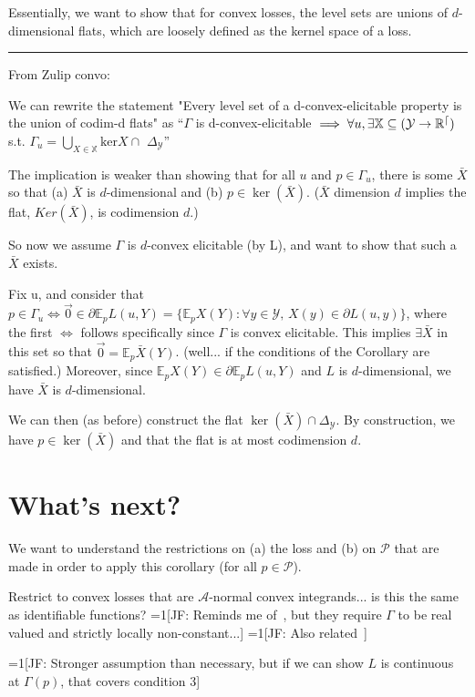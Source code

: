 \documentclass[12pt]{article}
\newcommand{\Comments}{1}
\newcommand{\mynote}[2]{\ifnum\Comments=1\textcolor{#1}{#2}\fi}
\newcommand{\jessie}[1]{\mynote{green!75!black}{[JF: #1]}}
\newcommand{\A}{\mathcal{A}}
\newcommand{\E}{\mathbb{E}}
\renewcommand{\P}{\mathcal{P}}
\begin{document}
Essentially, we want to show that for convex losses, the level sets are unions of $d$-dimensional flats, which are loosely defined as the kernel space of a loss.

\hrule
From Zulip convo:

We can rewrite the statement "Every level set of a d-convex-elicitable property is the union of codim-d flats" as 
``$\Gamma$ is d-convex-elicitable $\implies \forall u, \exists \mathbb X \subseteq  (\cal Y \to\mathbb{R}^d)$  s.t.  $\Gamma_u = \bigcup_{X \in \mathbb{X}} \mathrm{ker} X \cap \,\,\Delta_{\mathcal{Y}}$''

The implication is weaker than showing that for all $u$ and $p \in \Gamma_u$, there is some $\bar X$ so that (a) $\bar X$ is $d$-dimensional and (b) $p \in \ker( \bar X)$.  ($\bar X$ dimension $d$ implies the flat, $Ker(\bar X)$, is codimension $d$.)

So now we assume $\Gamma$ is $d$-convex elicitable (by L), and want to show that such a $\bar X$ exists.

Fix u, and consider that $p \in \Gamma_u \iff \vec 0 \in \partial \mathbb{E}_p L(u,Y) = \{\E_p X(Y) : \forall y \in \mathcal{Y}, \, X(y) \in \partial L(u,y) \}$, where the first $\iff$ follows specifically since $\Gamma$ is convex elicitable.  
This implies $\exists \bar X$ in this set so that $\vec 0 = \E_p \bar X(Y)$.  
(well... if the conditions of the Corollary are satisfied.)  
Moreover, since $\E_p X(Y) \in \partial \mathbb{E}_p L(u,Y)$ and $L$ is $d$-dimensional, we have $\bar X$ is $d$-dimensional.

We can then (as before) construct the flat $ \ker(\bar X) \cap \Delta_{\mathcal{Y}}$.  
By construction, we have $p \in \ker(\bar X)$ and that the flat is at most codimension $d$.

\section{What's next?}
We want to understand the restrictions on (a) the loss and (b) on $\P$ that are made in order to apply this corollary (for all $p\in \P$).

Restrict to convex losses that are $\A$-normal convex integrands... is this the same as identifiable functions?
\jessie{Reminds me of~\cite[Theorem 5]{steinwart2014elicitation}, but they require $\Gamma$ to be real valued and strictly locally non-constant...}
\jessie{Also related~\cite[Theorem 2]{gneiting2011making}}

\jessie{Stronger assumption than necessary, but if we can show $L$ is continuous at $\Gamma(p)$, that covers condition 3}
\end{document}
